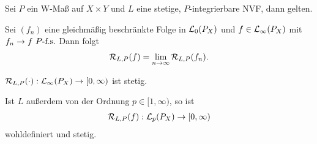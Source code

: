 \begin{lem}
\label{prop:2.1.6}
Sei $P$ ein W-Maß auf $X\times Y$ und $L$ eine stetige, $P$-integrierbare NVF,
dann gelten.
\begin{propenum}
\item\label{prop:2.1.6:1} Sei $(f_n)$ eine gleichmäßig beschränkte Folge in
$\mathcal{L}_0(P_X)$ und $f\in \mathcal{L}_\infty(P_X)$ mit $f_n\to f\ P\text{-f.s.}$ Dann folgt
\begin{align*}
\mathcal{R}_{L,P}(f) = \lim\limits_{n\to\infty} \mathcal{R}_{L,P}(f_n).
\end{align*}
\item\label{prop:2.1.6:2} $\mathcal{R}_{L,P}(\cdot) : \mathcal{L}_\infty(P_X) \to [0,\infty)$
ist stetig.
\item\label{prop:2.1.6:3} Ist $L$ außerdem von der Ordnung $p\in[1,\infty)$, so
ist
\begin{align*}
\mathcal{R}_{L,P}(f) : \mathcal{L}_p(P_X) \to [0,\infty)
\end{align*}
wohldefiniert und stetig.\fishhere
\end{propenum}
\end{lem}
